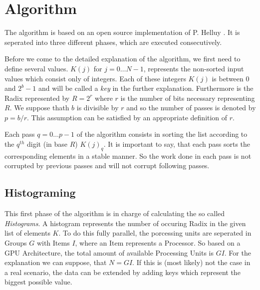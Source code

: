 \documentclass{llncs}
\title{\doctype}
\author{Hennadiy Yatskov\\ Nico Mürdter}
\institute{
Karlsruhe Institute of Technology, Karlsruhe, Germany\\
\email{hennadiy.yatskov@student.kit.edu\\ nico.muerdter@student.kit.edu}}
\begin{document}

\def\iterationcnt{5}

\maketitle

\begin{abstract}
TODO
\end{abstract}

\pagestyle{plain}

\section{Algorithm}
The algorithm is based on an open source implementation of P. Helluy \cite{ocl-radix-helluy}. It is seperated into three different phases, which are executed consecutively.

Before we come to the detailed explanation of the algorithm, we first need to define several values. $K(j)$ for $j=0 \dots N-1$, represents the non-sorted input values which consist only of integers. Each of these integers $K(j)$ is between $0$ and $2^b - 1$ and will be called a \textit{key} in the further explanation. Furthermore is the Radix represented by $R = 2^r$ where $r$ is the number of bits necessary representing $R$. We suppose thath $b$ is divisible by $r$ and so the number of passes is denoted by $p = b/r$. This assumption can be satisfied by an appropriate definition of $r$.


Each pass $q=0 \dots p-1$ of the algorithm consists in sorting the list according to the $q^{th}$ digit (in base $R$) $K(j)_q$. It is important to say, that each pass sorts the corresponding elements in a stable manner. So the work done in each pass is not corrupted by previous passes and will not corrupt following passes.

\subsection{Histograming}
This first phase of the algorithm is in charge of calculating the so called \textit{Histograms}. A histogram represents the number of occuring Radix in the given list of elements $K$. To do this fully parallel, the porcessing units are seperated in Groups $G$ with Items $I$, where an Item represents a Processor. So based on a GPU Architecture, the total amount of available Processing Units is $GI$. For the explanation we can suppose, that $N=GI$. If this is (most likely) not the case in a real scenario, the data can be extended by adding keys which represent the biggest possible value.
\end{document}
